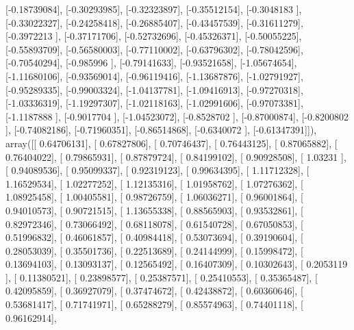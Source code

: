\documentclass{article}
\begin{document}
       [-0.18739084],
       [-0.30293985],
       [-0.32323897],
       [-0.35512154],
       [-0.3048183 ],
       [-0.33022327],
       [-0.24258418],
       [-0.26885407],
       [-0.43457539],
       [-0.31611279],
       [-0.3972213 ],
       [-0.37171706],
       [-0.52732696],
       [-0.45326371],
       [-0.50055225],
       [-0.55893709],
       [-0.56580003],
       [-0.77110002],
       [-0.63796302],
       [-0.78042596],
       [-0.70540294],
       [-0.985996  ],
       [-0.79141633],
       [-0.93521658],
       [-1.05674654],
       [-1.11680106],
       [-0.93569014],
       [-0.96119416],
       [-1.13687876],
       [-1.02791927],
       [-0.95289335],
       [-0.99003324],
       [-1.04137781],
       [-1.09416913],
       [-0.97270318],
       [-1.03336319],
       [-1.19297307],
       [-1.02118163],
       [-1.02991606],
       [-0.97073381],
       [-1.1187888 ],
       [-0.9017704 ],
       [-1.04523072],
       [-0.8528702 ],
       [-0.87000874],
       [-0.8200802 ],
       [-0.74082186],
       [-0.71960351],
       [-0.86514868],
       [-0.6340072 ],
       [-0.61347391]]), array([[ 0.64706131],
       [ 0.67827806],
       [ 0.70746437],
       [ 0.76443125],
       [ 0.87065882],
       [ 0.76404022],
       [ 0.79865931],
       [ 0.87879724],
       [ 0.84199102],
       [ 0.90928508],
       [ 1.03231   ],
       [ 0.94089536],
       [ 0.95099337],
       [ 0.92319123],
       [ 0.99634395],
       [ 1.11712328],
       [ 1.16529534],
       [ 1.02277252],
       [ 1.12135316],
       [ 1.01958762],
       [ 1.07276362],
       [ 1.08925458],
       [ 1.00405581],
       [ 0.98726759],
       [ 1.06036271],
       [ 0.96001864],
       [ 0.94010573],
       [ 0.90721515],
       [ 1.13655338],
       [ 0.88565903],
       [ 0.93532861],
       [ 0.82972346],
       [ 0.73066492],
       [ 0.68118078],
       [ 0.61540728],
       [ 0.67050853],
       [ 0.51996832],
       [ 0.46061857],
       [ 0.40984418],
       [ 0.53073694],
       [ 0.39190604],
       [ 0.28053039],
       [ 0.35501736],
       [ 0.22513689],
       [ 0.24144999],
       [ 0.15998472],
       [ 0.13694103],
       [ 0.13093137],
       [ 0.12565492],
       [ 0.16407309],
       [ 0.10302643],
       [ 0.2053119 ],
       [ 0.11380521],
       [ 0.23898577],
       [ 0.25387571],
       [ 0.25410553],
       [ 0.35365487],
       [ 0.42095859],
       [ 0.36927079],
       [ 0.37474672],
       [ 0.42438872],
       [ 0.60360646],
       [ 0.53681417],
       [ 0.71741971],
       [ 0.65288279],
       [ 0.85574963],
       [ 0.74401118],
       [ 0.96162914],
\end{document}
